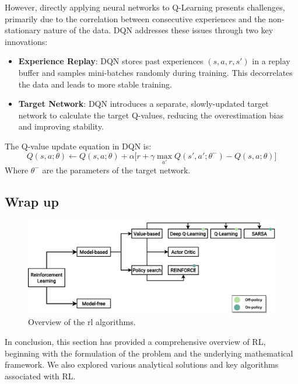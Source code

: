 However, directly applying neural networks to Q-Learning presents challenges, 
 primarily due to the correlation between consecutive experiences and the non-stationary nature of the data. 
 DQN addresses these issues through two key innovations:
 
\begin{itemize}
  \item \textbf{Experience Replay}: DQN stores past experiences \((s, a, r, s')\) in a replay buffer and samples mini-batches randomly during training. 
  This decorrelates the data and leads to more stable training.
  \item \textbf{Target Network}: DQN introduces a separate, 
  slowly-updated target network to calculate the target Q-values, 
  reducing the overestimation bias and improving stability.
\end{itemize}
 
The Q-value update equation in DQN is:
\begin{equation}
Q(s, a; \theta) \leftarrow Q(s, a; \theta) + \alpha \Big[ r + \gamma \max_{a'} Q(s', a'; \theta^-) - Q(s, a; \theta) \Big]
\end{equation}
Where \(\theta^-\) are the parameters of the target network.
\subsection{Wrap up}
\begin{figure}
  \includegraphics[width=\textwidth]{chapters/img/rl-overview.drawio.pdf}
  \caption{Overview of the \ac{rl} algorithms.}\label{fig:rl:overview}
\end{figure}
In conclusion, 
 this section has provided a comprehensive overview of RL, 
 beginning with the formulation of the problem and the underlying mathematical framework. We also explored various analytical solutions and key algorithms associated with RL. 

